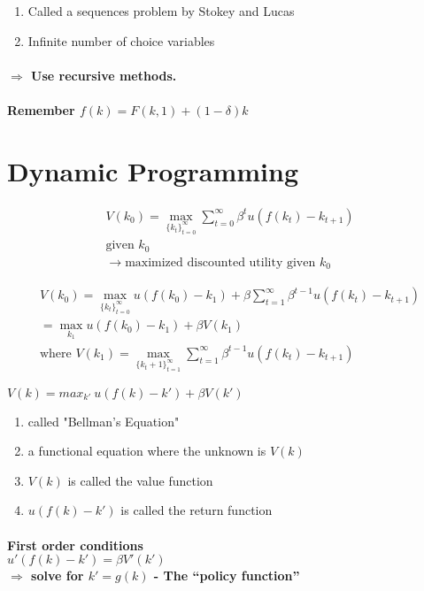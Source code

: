 \documentclass{article}
\begin{document}
\begin{enumerate}
    \item Called a sequences problem by Stokey and Lucas
    \item Infinite number of choice variables
\end{enumerate}

\paragraph{$\Rightarrow$ Use recursive methods.}
\paragraph{Remember $f(k) = F(k,1) + (1-\delta)k$}

\section{Dynamic Programming}

\[
    \begin{aligned}
        V(k_0) = \max_{\{k_t\}_{t=0}^\infty} \sum_{t=0}^\infty \beta^t u(f(k_t) - k_{t+1})\\
        \text{given } k_0 \\
        \rightarrow \text {maximized discounted utility given } k_0
    \end{aligned}
    \]

\[
    \begin{aligned}
        V(k_0) = \max_{\{k_t\}_{t=0}^\infty} u(f(k_0)-k_1) + \beta \sum_{t=1}^\infty \beta^{t-1} u(f(k_t) - k_{t+1})\\
        = \max_{k_1} u(f(k_0)-k_1) + \beta V(k_1)\\
        \text{where } V(k_1) = \max_{\{k_t+1\}_{t=1}^\infty} \sum_{t=1}^\infty \beta^{t-1} u(f(k_t) - k_{t+1})
    \end{aligned}
    \]

$V(k) = max_{k'}\ u(f(k) - k') + \beta V(k')$
\begin{enumerate}
    \item called "Bellman's Equation"
    \item a functional equation where the unknown is $V(k)$
    \item $V(k)$ is called the value function
    \item $u(f(k) - k')$ is called the return function
\end{enumerate}

\paragraph{First order conditions \\
$u'(f(k) - k') = \beta V'(k')$ \\
$\Rightarrow$ solve for $k' = g(k)$ - The ``policy function''}
\end{document}
